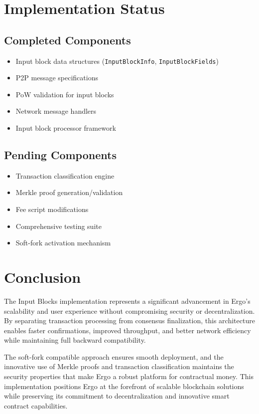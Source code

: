 \documentclass{llncs}
\newcommand{\code}[1]{\texttt{#1}}
\begin{document}
\section{Implementation Status}

\subsection{Completed Components}

\begin{itemize}
\item Input block data structures (\code{InputBlockInfo}, \code{InputBlockFields})
\item P2P message specifications
\item PoW validation for input blocks
\item Network message handlers
\item Input block processor framework
\end{itemize}

\subsection{Pending Components}

\begin{itemize}
\item Transaction classification engine
\item Merkle proof generation/validation
\item Fee script modifications
\item Comprehensive testing suite
\item Soft-fork activation mechanism
\end{itemize}

\section{Conclusion}

The Input Blocks implementation represents a significant advancement in Ergo's scalability and user experience without compromising security or decentralization. By separating transaction processing from consensus finalization, this architecture enables faster confirmations, improved throughput, and better network efficiency while maintaining full backward compatibility.

The soft-fork compatible approach ensures smooth deployment, and the innovative use of Merkle proofs and transaction classification maintains the security properties that make Ergo a robust platform for contractual money. This implementation positions Ergo at the forefront of scalable blockchain solutions while preserving its commitment to decentralization and innovative smart contract capabilities.
\end{document}
